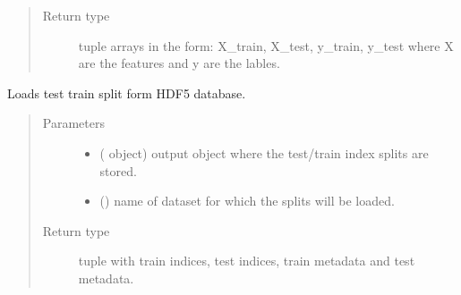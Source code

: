 \documentclass[letterpaper,10pt,english]{sphinxmanual}
\begin{document}
\begin{fulllineitems}
\begin{fulllineitems}
\begin{quote}
\begin{description}
\begin{itemize}
\end{itemize}

\item[{Return type}] \leavevmode
tuple arrays in the form: X\_train, X\_test, y\_train, y\_test where X are the features and y are the lables.

\end{description}\end{quote}

\end{fulllineitems}


\begin{fulllineitems}
\label{\detokenize{data:mleap.data.data.Data.load_train_test_split}}
Loads test train split form HDF5 database.
\begin{quote}\begin{description}
\item[{Parameters}] \leavevmode\begin{itemize}
\item {} 
 ({\hyperref[\detokenize{shared:mleap.shared.files_io.FilesIO}]{}} object) \textendash{} {\hyperref[\detokenize{shared:mleap.shared.files_io.FilesIO}]{}} output object where the test/train index splits are stored.

\item {} 
 () \textendash{} name of dataset for which the splits will be loaded.

\end{itemize}

\item[{Return type}] \leavevmode
tuple with train indices, test indices, train metadata and test metadata.

\end{description}\end{quote}

\end{fulllineitems}



\end{fulllineitems}
\end{document}
